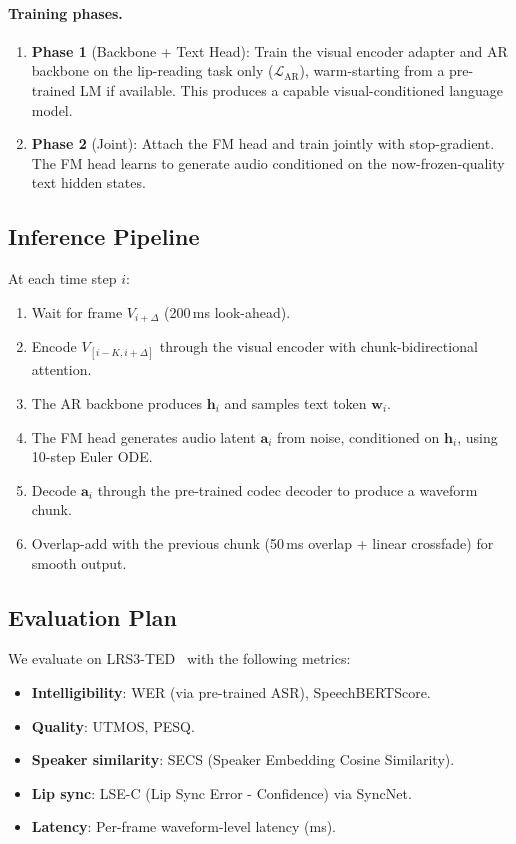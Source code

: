 \documentclass{article}
\begin{document}
\paragraph{Training phases.}
\begin{enumerate}
    \item \textbf{Phase 1} (Backbone + Text Head): Train the visual encoder adapter and AR backbone on the lip-reading task only ($\mathcal{L}_{\text{AR}}$), warm-starting from a pre-trained LM if available. This produces a capable visual-conditioned language model.
    \item \textbf{Phase 2} (Joint): Attach the FM head and train jointly with stop-gradient. The FM head learns to generate audio conditioned on the now-frozen-quality text hidden states.
\end{enumerate}

\subsection{Inference Pipeline}

At each time step $i$:
\begin{enumerate}
    \item Wait for frame $V_{i+\Delta}$ (200\,ms look-ahead).
    \item Encode $V_{[i-K, i+\Delta]}$ through the visual encoder with chunk-bidirectional attention.
    \item The AR backbone produces $\mathbf{h}_i$ and samples text token $\mathbf{w}_i$.
    \item The FM head generates audio latent $\mathbf{a}_i$ from noise, conditioned on $\mathbf{h}_i$, using 10-step Euler ODE.
    \item Decode $\mathbf{a}_i$ through the pre-trained codec decoder to produce a waveform chunk.
    \item Overlap-add with the previous chunk (50\,ms overlap + linear crossfade) for smooth output.
\end{enumerate}

\subsection{Evaluation Plan}

We evaluate on LRS3-TED~\cite{lrs3} with the following metrics:
\begin{itemize}
    \item \textbf{Intelligibility}: WER (via pre-trained ASR), SpeechBERTScore.
    \item \textbf{Quality}: UTMOS, PESQ.
    \item \textbf{Speaker similarity}: SECS (Speaker Embedding Cosine Similarity).
    \item \textbf{Lip sync}: LSE-C (Lip Sync Error - Confidence) via SyncNet.
    \item \textbf{Latency}: Per-frame waveform-level latency (ms).
\end{itemize}
\end{document}
